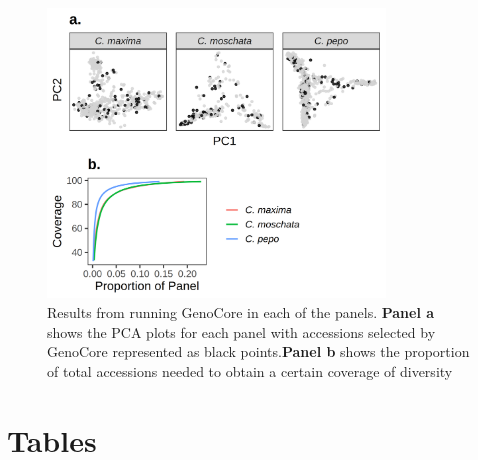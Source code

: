 \documentclass[utf8]{FrontiersinHarvard} %
\begin{document}
\begin{figure}[h]
	\begin{center}
		\includegraphics[width=0.8\textwidth]{../../supplemental/03_supfig.png}
	\end{center}
	\caption{Results from running GenoCore in each of the panels. \textbf{Panel a} shows the PCA plots for each panel with accessions selected by GenoCore represented as black points.\textbf{Panel b} shows the proportion of total accessions needed to obtain a certain coverage of diversity \label{fig:9}}
\end{figure}




\clearpage

\section*{Tables}
\end{document}
